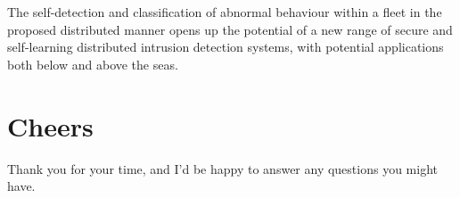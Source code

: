 \documentclass[oneside,11pt,a4paper]{Latex/Classes/PhDthesisPSnPDF}
\begin{document}
\begin{doublespace}
The self-detection and classification of abnormal behaviour within a fleet in
the proposed distributed manner opens up the potential of a new range of secure
and self-learning distributed intrusion detection systems, with potential
applications both below and above the seas.

\section{Cheers}  Thank you for your time, and I'd be happy to answer any questions
you might have.
\end{doublespace}
\end{document}
